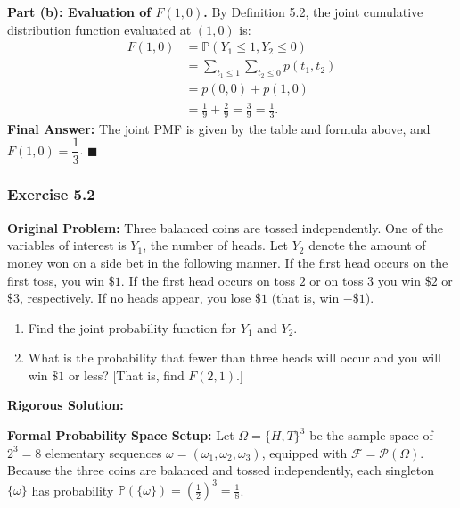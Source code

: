 \documentclass[11pt, letterpaper]{article}
\theoremstyle{definition}
\theoremstyle{remark}
\begin{document}
\textbf{Part (b): Evaluation of $F(1, 0)$.}
By Definition 5.2, the joint cumulative distribution function evaluated at $(1, 0)$ is:
\begin{align*}
    F(1, 0) &= \mathbb{P}(Y_1 \le 1, Y_2 \le 0) \\
    &= \sum_{t_1 \le 1} \sum_{t_2 \le 0} p(t_1, t_2) \\
    &= p(0, 0) + p(1, 0) \\
    &= \frac{1}{9} + \frac{2}{9} = \frac{3}{9} = \frac{1}{3}.
\end{align*}
\textbf{Final Answer:} The joint PMF is given by the table and formula above, and $F(1, 0) = \dfrac{1}{3}$. $\blacksquare$

\bigskip

\subsubsection*{Exercise 5.2}
\textbf{Original Problem:} Three balanced coins are tossed independently. One of the variables of interest is $Y_1$, the number of heads. Let $Y_2$ denote the amount of money won on a side bet in the following manner. If the first head occurs on the first toss, you win $\$1$. If the first head occurs on toss $2$ or on toss $3$ you win $\$2$ or $\$3$, respectively. If no heads appear, you lose $\$1$ (that is, win $-\$1$).
\begin{enumerate}[label=\textbf{\alph*}]
    \item Find the joint probability function for $Y_1$ and $Y_2$.
    \item What is the probability that fewer than three heads will occur and you will win $\$1$ or less? [That is, find $F(2, 1)$.]
\end{enumerate}

\textbf{Rigorous Solution:}

\textbf{Formal Probability Space Setup:} Let $\Omega = \{H, T\}^3$ be the sample space of $2^3 = 8$ elementary sequences $\omega = (\omega_1, \omega_2, \omega_3)$, equipped with $\mathcal{F} = \mathcal{P}(\Omega)$. Because the three coins are balanced and tossed independently, each singleton $\{\omega\}$ has probability $\mathbb{P}(\{\omega\}) = \left(\frac{1}{2}\right)^3 = \frac{1}{8}$.
\end{document}
